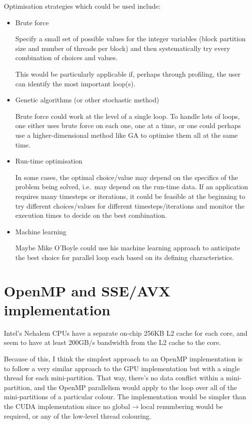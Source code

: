 \documentclass[12pt]{article}
\begin{document}
Optimisation strategies which could be used include:
\begin{itemize}
\item
Brute force

Specify a small set of possible values for the integer variables
(block partition size and number of threads per block) and then 
systematically try every combination of choices and values.

This would be particularly applicable if, perhaps through 
profiling, the user can identify the most important loop(s).

\item
Genetic algorithms (or other stochastic method)

Brute force could work at the level of a single loop.  To handle
lots of loops, one either uses brute force on each one, one at 
a time, or one could perhaps use a higher-dimensional method
like GA to optimise them all at the same time.

\item
Run-time optimisation

In some cases, the optimal choice/value may depend on the specifics 
of the problem being solved, i.e.~may depend on the run-time data.
If an application requires many timesteps or iterations, it could 
be feasible at the beginning to try different choices/values for
different timesteps/iterations and monitor the execution times to
decide on the best combination.

\item
Machine learning

Maybe Mike O'Boyle could use his machine learning approach to 
anticipate the best choice for parallel loop each based on its 
defining characteristics.

\end{itemize}



\newpage

\section{OpenMP and SSE/AVX implementation}


Intel's Nehalem CPUs have a separate on-chip 256KB L2 cache for each 
core, and seem to have at least 200GB/s bandwidth from the L2 cache 
to the core.

Because of this, I think the simplest approach to an OpenMP 
implementation is to follow a very similar approach to the GPU 
implementation but with a single thread for each mini-partition. 
That way, there's no data conflict within a mini-partition, and 
the OpenMP parallelism would apply to the loop over all of the 
mini-partitions of a particular colour. 
The implementation would be simpler than the CUDA implementation 
since no global$\rightarrow$local renumbering would be required, 
or any of the low-level thread colouring. 
\end{document}
